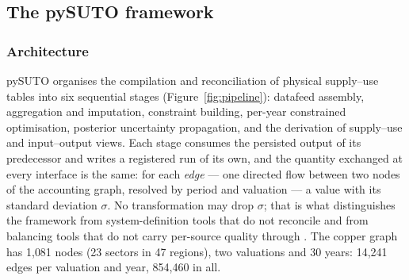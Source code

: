 \subsection{The pySUTO framework}\label{sec:framework}

\subsubsection{Architecture}\label{sec:arch}

pySUTO organises the compilation and reconciliation of physical supply--use
tables into six sequential stages (Figure~\ref{fig:pipeline}): datafeed
assembly, aggregation and imputation, constraint building, per-year
constrained optimisation, posterior uncertainty propagation, and the
derivation of supply--use and input--output views. Each stage consumes the
persisted output of its predecessor and writes a registered run of its own,
and the quantity exchanged at every interface is the same: for each
\emph{edge} --- one directed flow between two nodes of the accounting graph,
resolved by period and valuation --- a value with its standard deviation
$\sigma$. No transformation may drop $\sigma$; that is what distinguishes
the framework from system-definition tools that do not reconcile
\citep{pauliuk2020odym} and from balancing tools that do not carry
per-source quality through \citep{lenzen2009matrix, wieland2022piolab}. The
copper graph has 1{,}081 nodes (23 sectors in 47 regions), two valuations and
30 years: 14{,}241 edges per valuation and year, 854{,}460 in all.

